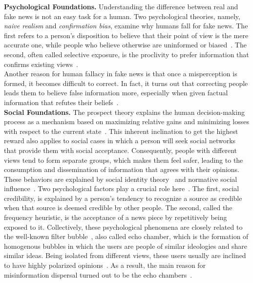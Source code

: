 \textbf{Psychological Foundations.}  Understanding the difference between real and fake news is not an easy task for a human. Two psychological theories, namely, \emph{naive realism} and \emph{confirmation bias}, examine why humans fall for fake news. The first refers to a person's disposition to believe that their point of view is the mere accurate one, while people who believe otherwise are uninformed or biased~\parencite{NaiveRealism_Reed}. The second, often called selective exposure, is the proclivity to prefer information that confirms existing views~\parencite{ConfirmationBias_Nickerson}.\\
Another reason for human fallacy in fake news is that once a misperception is formed, it becomes difficult to correct. In fact, it turns out that correcting people leads them to believe false information more, especially when given factual information that refutes their beliefs~\parencite{WhenCorrectionsFail_Nyhan}.\\

\textbf{Social Foundations.}  The prospect theory explains the human decision-making process as a mechanism based on maximizing relative gains and minimizing losses with respect to the current state~\parencite{ProspectTheory_Kahneman, AdvancesInProspectTheory_Kahneman}. This inherent inclination to get the highest reward also applies to social cases in which a person will seek social networks that provide them with social acceptance. Consequently,  people with different views tend to form separate groups, which makes them feel safer, leading to the consumption
and dissemination of information that agrees with their opinions. These behaviors are explained by social identity
theory~\parencite{SocialIdentityTheory_Ashforth} and normative social influence~\parencite{NormativeSocialInfluence_Asch}.
Two psychological factors play a crucial role here~\parencite{TheRussianFirehoseOfFalsehood_Paul}. The first, social credibility, is explained
by a person’s tendency to recognize a source as credible when that source is deemed credible by other people. The second, called the frequency heuristic, is the acceptance of a news piece by repetitively being exposed to it. Collectively, these psychological phenomena are closely related to the well-known filter bubble~\parencite{TheFilterBubble_Pariser}, also called echo chamber, which is the formation of homogenous bubbles in which the users are people of similar ideologies and share similar ideas. Being isolated from different views, these users usually are inclined to have highly polarized opinions~\parencite{EchoChambers_Sunstein}. As a result, the main reason for misinformation dispersal turned out to be the echo
chambers~\parencite{TheSpreadingOfMisinformationOnline_DelVicario}.\\

